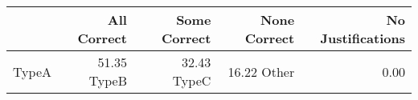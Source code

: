 \begin{tabular}{lrrrr}
\toprule
 & All Correct & Some Correct & None Correct & No Justifications \\
\midrule
TypeA & 51.35%
TypeB & 32.43%
TypeC & 16.22%
Other & 0.00%
\bottomrule
\end{tabular}
